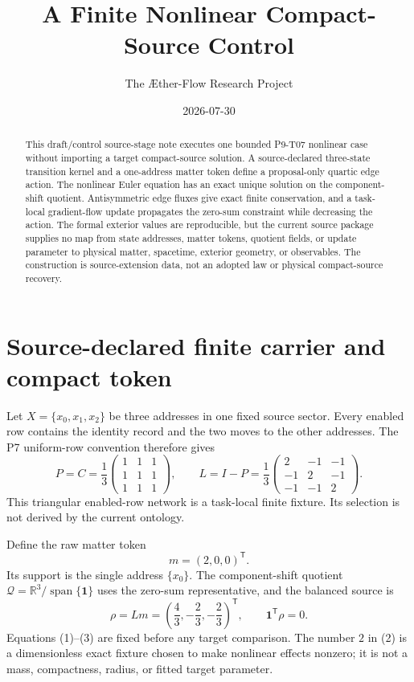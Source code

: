 \documentclass[11pt]{article}
\title{A Finite Nonlinear Compact-Source Control}
\author{The \AE ther-Flow Research Project}
\date{2026-07-30}
\newcommand{\one}{\mathbf 1}
\newcommand{\Qspace}{\mathcal Q}
\begin{document}
\maketitle

\begin{abstract}
This draft/control source-stage note executes one bounded P9-T07 nonlinear
case without importing a target compact-source solution.  A source-declared
three-state transition kernel and a one-address matter token define a
proposal-only quartic edge action.  The nonlinear Euler equation has an exact
unique solution on the component-shift quotient.  Antisymmetric edge fluxes
give exact finite conservation, and a task-local gradient-flow update
propagates the zero-sum constraint while decreasing the action.  The formal
exterior values are reproducible, but the current source package supplies no
map from state addresses, matter tokens, quotient fields, or update parameter
to physical matter, spacetime, exterior geometry, or observables.  The
construction is source-extension data, not an adopted law or physical
compact-source recovery.
\end{abstract}

\section{Source-declared finite carrier and compact token}

Let \(X=\{x_0,x_1,x_2\}\) be three addresses in one fixed source sector.
Every enabled row contains the identity record and the two moves to the other
addresses.  The P7 uniform-row convention therefore gives
\[
 P=C=\frac13
 \begin{pmatrix}
 1&1&1\\
 1&1&1\\
 1&1&1
 \end{pmatrix},
 \qquad
 L=I-P=
 \frac13
 \begin{pmatrix}
 2&-1&-1\\
 -1&2&-1\\
 -1&-1&2
 \end{pmatrix}.
 \tag{1}
\]
This triangular enabled-row network is a task-local finite fixture.  Its
selection is not derived by the current ontology.

Define the raw matter token
\[
 m=(2,0,0)^{\mathsf T}.
 \tag{2}
\]
Its support is the single address \(\{x_0\}\).  The component-shift quotient
\(\Qspace=\mathbb R^3/\operatorname{span}\{\one\}\) uses the zero-sum
representative, and the balanced source is
\[
 \rho=Lm=
 \left(\frac43,-\frac23,-\frac23\right)^{\mathsf T},
 \qquad \one^{\mathsf T}\rho=0.
 \tag{3}
\]
Equations (1)--(3) are fixed before any target comparison.  The number \(2\)
in (2) is a dimensionless exact fixture chosen to make nonlinear effects
nonzero; it is not a mass, compactness, radius, or fitted target parameter.
\end{document}
